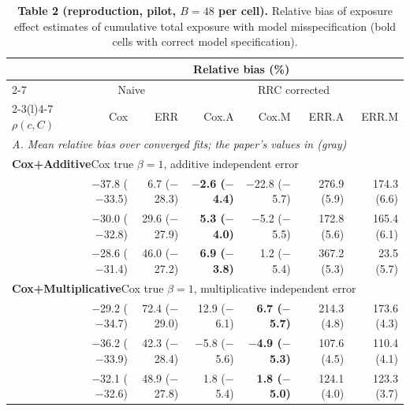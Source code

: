 \documentclass[10pt]{article}
\begin{document}
\begin{table}[ht]\centering\footnotesize
\begin{threeparttable}
\caption*{\textbf{Table 2 (reproduction, pilot, $B = 48$ per cell).} Relative bias of exposure effect estimates of cumulative total exposure with model misspecification (bold cells with correct model specification).}
\begin{tabular}{l rrrrrr}
\toprule
 & \multicolumn{6}{c}{Relative bias (\%)} \\
\cmidrule(l){2-7}
 & \multicolumn{2}{c}{Naive} & \multicolumn{4}{c}{RRC corrected} \\
\cmidrule(lr){2-3}\cmidrule(l){4-7}
$\rho(c, C)$ & Cox & ERR & Cox.A & Cox.M & ERR.A & ERR.M \\
\midrule
\multicolumn{7}{l}{\textit{A. Mean relative bias over converged fits; the paper's values in {\color{gray}(gray)}}} \\[2pt]
\multicolumn{7}{l}{\textbf{Cox+Additive}\quad Cox true $\beta = 1$, additive independent error} \\
\quad 0.3 & $-$37.8 {\color{gray}($-$33.5)} & 6.7 {\color{gray}($-$28.3)} & \boldmath\textbf{$-$2.6 {\color{gray}($-$4.4)}} & $-$22.8 {\color{gray}($-$5.7)} & 276.9 {\color{gray}(5.9)} & 174.3 {\color{gray}(6.6)} \\
\quad 0.6 & $-$30.0 {\color{gray}($-$32.8)} & 29.6 {\color{gray}($-$27.9)} & \boldmath\textbf{5.3 {\color{gray}($-$4.0)}} & $-$5.2 {\color{gray}($-$5.5)} & 172.8 {\color{gray}(5.6)} & 165.4 {\color{gray}(6.1)} \\
\quad 0.9 & $-$28.6 {\color{gray}($-$31.4)} & 46.0 {\color{gray}($-$27.2)} & \boldmath\textbf{6.9 {\color{gray}($-$3.8)}} & 1.2 {\color{gray}($-$5.4)} & 367.2 {\color{gray}(5.3)} & 23.5 {\color{gray}(5.7)} \\
\midrule
\multicolumn{7}{l}{\textbf{Cox+Multiplicative}\quad Cox true $\beta = 1$, multiplicative independent error} \\
\quad 0.3 & $-$29.2 {\color{gray}($-$34.7)} & 72.4 {\color{gray}($-$29.0)} & 12.9 {\color{gray}($-$6.1)} & \boldmath\textbf{6.7 {\color{gray}($-$5.7)}} & 214.3 {\color{gray}(4.8)} & 173.6 {\color{gray}(4.3)} \\
\quad 0.6 & $-$36.2 {\color{gray}($-$33.9)} & 42.3 {\color{gray}($-$28.4)} & $-$5.8 {\color{gray}($-$5.6)} & \boldmath\textbf{$-$4.9 {\color{gray}($-$5.3)}} & 107.6 {\color{gray}(4.5)} & 110.4 {\color{gray}(4.1)} \\
\quad 0.9 & $-$32.1 {\color{gray}($-$32.6)} & 48.9 {\color{gray}($-$27.8)} & 1.8 {\color{gray}($-$5.4)} & \boldmath\textbf{1.8 {\color{gray}($-$5.0)}} & 124.1 {\color{gray}(4.0)} & 123.3 {\color{gray}(3.7)} \\

\end{tabular}
\end{threeparttable}
\end{table}
\end{document}
